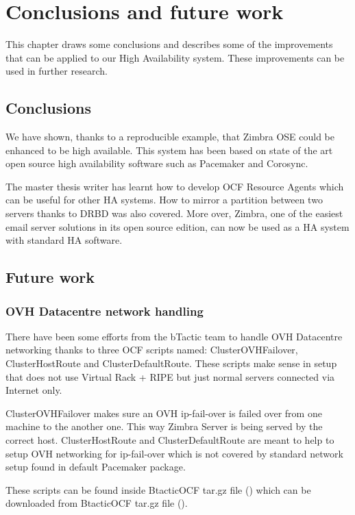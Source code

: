 

\chapter{Conclusions and future work}
\label{chap:conclusions-and-future-work}
This chapter draws some conclusions and describes some of the improvements that can be applied to our High Availability system. These improvements can be used in further research.

\section {Conclusions}

We have shown, thanks to a reproducible example, that Zimbra OSE could be enhanced to be high available. This system has been based on state of the art open source high availability software such as Pacemaker and Corosync.

The master thesis writer has learnt how to develop OCF Resource Agents which can be useful for other HA systems. How to mirror a partition between two servers thanks to DRBD was also covered. More over, Zimbra, one of the easiest email server solutions in its open source edition, can now be used as a HA system with standard HA software.

\section {Future work}

\subsection {OVH Datacentre network handling}
There have been some efforts from the bTactic team to handle OVH Datacentre networking thanks to three OCF scripts named: 
ClusterOVHFailover, ClusterHostRoute and ClusterDefaultRoute. These scripts make sense in setup that does not use Virtual Rack + RIPE but just normal servers connected via Internet only.

ClusterOVHFailover makes sure an OVH ip-fail-over is failed over from one machine to the another one. This way Zimbra Server is being served by the correct host.
ClusterHostRoute and ClusterDefaultRoute are meant to help to setup OVH networking for ip-fail-over which is not covered by standard network setup found in  default Pacemaker package.

These scripts can be found inside BtacticOCF tar.gz file (\cite{BtacticOCF}) which can be downloaded from BtacticOCF  tar.gz file (\cite{BtacticOrg}).

